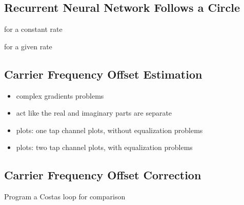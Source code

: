 \subsection{Recurrent Neural Network Follows a Circle}
\item for a constant rate
\item for a given rate


\subsection{Carrier Frequency Offset Estimation}
\begin{itemize}
\item complex gradients problems
\item act like the real and imaginary parts are separate
\item plots: one tap channel plots, without equalization problems
\item plots: two tap channel plots, with equalization problems
\end{itemize}

\subsection{Carrier Frequency Offset Correction}
Program a Costas loop for comparison 
